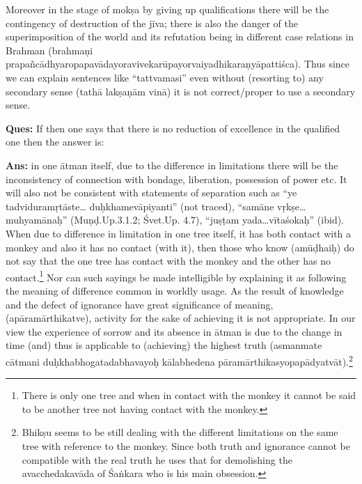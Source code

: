 Moreover in the stage of mokṣa by giving up qualifications there will be the contingency of destruction of the jīva; there is also the danger of the superimposition of the world and its refutation being in different case relations   in Brahman (brahmaṇi prapañcādhyaropapavādayoravivekarūpayorvaiyadhikaraṇyāpattiśca). Thus since we can explain sentences like “tattvamasi” even without (resorting to) any secondary sense (tathā lakṣaṇām vinā) it is not correct/proper to use a secondary sense.

\textbf{Ques:} If then one says that there is no reduction of excellence in the qualified one then the answer is:

\textbf{Ans:} in one ātman itself, due to the difference in limitations there will be the inconsistency of connection with bondage, liberation, possession of power etc. It will also not be consistent with statements of separation such as “ye tadviduramṛtāste…   duḥkhamevāpiyanti” (not traced), “samāne vṛkṣe…muhyamānaḥ” (Muṇḍ.Up.3.1.2; Śvet.Up. 4.7), “juṣṭam yada…vītaśokaḥ” (ibid). When due to difference in limitation in one tree itself, it has both contact with a monkey and also it has no contact (with it), then those who know (amūḍhaiḥ) do not say that the one tree has contact with the monkey and the other has no contact.\footnote{There is only one tree and when in contact with the monkey it cannot be said to be another tree not having contact with the monkey.} Nor can such sayings be made intelligible by explaining it as following the meaning of difference common in worldly usage. As the result of knowledge and the defect of ignorance have great significance of meaning, (apāramārthikatve), activity for the sake of achieving it is not appropriate. In our view the experience of sorrow and its absence in ātman is due to the change in time (and) thus is applicable to (achieving) the highest truth (asmanmate cātmani duḥkhabhogatadabhavayoḥ kālabhedena pāramārthikasyopapādyatvāt).\footnote{Bhikṣu seems to be still dealing with the different limitations on the same tree with reference to the monkey. Since both truth and ignorance cannot be compatible with the real truth he uses that for demolishing the avacchedakavāda of Śaṅkara who is his main obsession.} 


